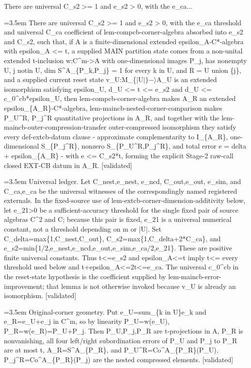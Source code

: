 \documentclass{article}
\newcommand{\step}[1]{\par\noindent\hangindent=3.5em\hangafter=1%
  \makebox[3.5em][l]{\textbf{#1.}}}
\newcommand{\steptag}[1]{\hfill{\small\textsf{[#1]}}}
\begin{document}
\begin{proofbox}{There are universal C\_s2 >= 1 and e\_s2 > 0, with the e\_ca...}
\step{1} There are universal C\_s2 >= 1 and e\_s2 > 0, with the e\_ca threshold and universal C\_ca coefficient of lem-compcb-corner-algebra absorbed into e\_s2 and C\_s2, such that, if A is a finite-dimensional extended epsilon\_A-C*-algebra with epsilon\_A <= t, a supplied MAIN partition state comes from a non-unital extended t-inclusion w:C\textasciicircum{}m->A with one-dimensional images P\_j, has nonempty U, j notin U, dim S\textasciicircum{}A\_\{P\_k,P\_j\} = 1 for every k in U, and R = U union \{j\}, and a supplied current reset state v\_U:M\_\{|U$|\}-\rangle$A\_U is an extended isomorphism satisfying epsilon\_U, d\_U <= t <= e\_s2 and d\_U <= c\_0\textasciicircum{}cb*epsilon\_U, then lem-compcb-corner-algebra makes A\_R an extended epsilon\_\{A\_R\}-C*-algebra, lem-maincb-nested-corner-comparison makes P\_U\textasciicircum{}R, P\_j\textasciicircum{}R quantitative projections in A\_R, and together with the lem-maincb-outer-compression-transfer outer-compressed isomorphism they satisfy every def-extcb-datum clause - approximate complementarity to I\_\{A\_R\}, one-dimensional S\_\{P\_j\textasciicircum{}R\}, nonzero S\_\{P\_U\textasciicircum{}R,P\_j\textasciicircum{}R\}, and total error e = delta + epsilon\_\{A\_R\} - with e <= C\_s2*t, forming the explicit Stage-2 raw-call closed EXT-CB datum in A\_R. \steptag{validated} \\[6pt]
\step{1.1} Universal ledger. Let C\_nest,e\_nest, e\_ncd, C\_out,e\_out, e\_sim, and C\_ca,e\_ca be the universal witnesses of the correspondingly named registered externals. In the fixed-source use of lem-extcb-corner-dimension-additivity below, let e\_21>0 be a sufficient-accuracy threshold for the single fixed pair of source algebras C\textasciicircum{}2 and C; because this pair is fixed, e\_21 is a universal numerical constant, not a threshold depending on m or |U|. Set C\_delta=max\{1,C\_nest,C\_out\}, C\_s2=max\{1,C\_delta+2*C\_ca\}, and e\_s2=min\{1/2,e\_nest,e\_ncd,e\_out,e\_sim,e\_ca/2,e\_21\}. These are positive finite universal constants. Thus t<=e\_s2 and epsilon\_A<=t imply t<= every threshold used below and t+epsilon\_A<=2t<=e\_ca. The universal c\_0\textasciicircum{}cb in the reset-state hypothesis is the coefficient supplied by lem-maincb-error-improvement; that lemma is not otherwise invoked because v\_U is already an isomorphism. \steptag{validated} \\[4pt]
\step{1.2} Original-corner geometry. Put e\_U=sum\_\{k in U\}e\_k and e\_R=e\_U+e\_j in C\textasciicircum{}m, so by linearity P\_U=w(e\_U), P\_R=w(e\_R)=P\_U+P\_j. Then P\_U,P\_j,P\_R are t-projections in A, P\_R is nonvanishing, all four left/right subordination errors of P\_U and P\_j to P\_R are at most t, A\_R=S\textasciicircum{}A\_\{P\_R\}, and P\_U\textasciicircum{}R=Co\textasciicircum{}A\_\{P\_R\}(P\_U), P\_j\textasciicircum{}R=Co\textasciicircum{}A\_\{P\_R\}(P\_j) are the nested compressed elements. \steptag{validated} \\[6pt]

\end{proofbox}
\end{document}
